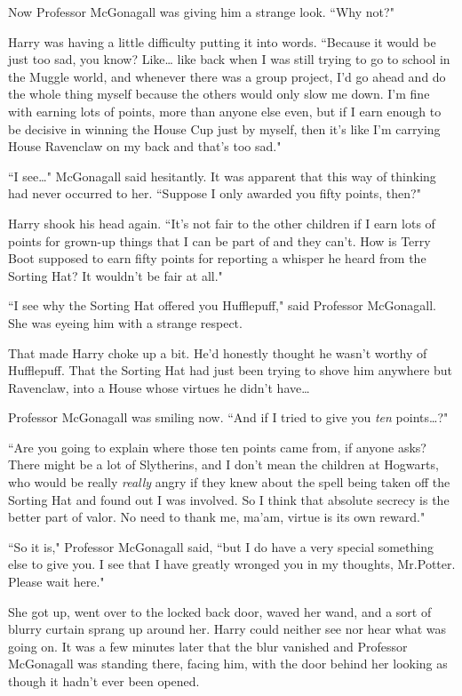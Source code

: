 Now Professor McGonagall was giving him a strange look. ``Why not?"

Harry was having a little difficulty putting it into words. ``Because it would be just too sad, you know? Like{\ldots} like back when I was still trying to go to school in the Muggle world, and whenever there was a group project, I'd go ahead and do the whole thing myself because the others would only slow me down. I'm fine with earning lots of points, more than anyone else even, but if I earn enough to be decisive in winning the House Cup just by myself, then it's like I'm carrying House Ravenclaw on my back and that's too sad."

``I see{\ldots}" McGonagall said hesitantly. It was apparent that this way of thinking had never occurred to her. ``Suppose I only awarded you fifty points, then?"

Harry shook his head again. ``It's not fair to the other children if I earn lots of points for grown-up things that I can be part of and they can't. How is Terry Boot supposed to earn fifty points for reporting a whisper he heard from the Sorting Hat? It wouldn't be fair at all."

``I see why the Sorting Hat offered you Hufflepuff," said Professor McGonagall. She was eyeing him with a strange respect.

That made Harry choke up a bit. He'd honestly thought he wasn't worthy of Hufflepuff. That the Sorting Hat had just been trying to shove him anywhere but Ravenclaw, into a House whose virtues he didn't have{\ldots}

Professor McGonagall was smiling now. ``And if I tried to give you \emph{ten} points{\ldots}?"

``Are you going to explain where those ten points came from, if anyone asks? There might be a lot of Slytherins, and I don't mean the children at Hogwarts, who would be really \emph{really} angry if they knew about the spell being taken off the Sorting Hat and found out I was involved. So I think that absolute secrecy is the better part of valor. No need to thank me, ma'am, virtue is its own reward."

``So it is," Professor McGonagall said, ``but I do have a very special something else to give you. I see that I have greatly wronged you in my thoughts, Mr.\?Potter. Please wait here."

She got up, went over to the locked back door, waved her wand, and a sort of blurry curtain sprang up around her. Harry could neither see nor hear what was going on. It was a few minutes later that the blur vanished and Professor McGonagall was standing there, facing him, with the door behind her looking as though it hadn't ever been opened.

